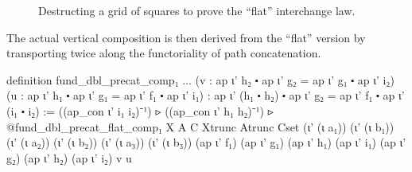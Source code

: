 \begin{figure}
\caption{Destructing a grid of squares to prove the ``flat'' interchange law.}
\label{fig:interchange-destruct}
\end{figure}

The actual vertical composition is then derived from the ``flat'' version by transporting
twice along the functoriality  of path concatenation.
\begin{leancodebr}
  definition fund_dbl_precat_comp₁ ...
    (v : ap ι' h₂ ⬝ ap ι' g₂ = ap ι' g₁ ⬝ ap ι' i₂)
    (u : ap ι' h₁ ⬝ ap ι' g₁ = ap ι' f₁ ⬝ ap ι' i₁) :
      ap ι' (h₁ ⬝ h₂) ⬝ ap ι' g₂ = ap ι' f₁ ⬝ ap ι' (i₁ ⬝ i₂) :=
  ((ap_con ι' i₁ i₂)⁻¹) ▹ ((ap_con ι' h₁ h₂)⁻¹) ▹
  @fund_dbl_precat_flat_comp₁ X A C Xtrunc Atrunc Cset
    (ι' (ι a₁)) (ι' (ι b₁)) (ι' (ι a₂)) (ι' (ι b₂)) (ι' (ι a₃)) (ι' (ι b₃))
    (ap ι' f₁) (ap ι' g₁) (ap ι' h₁) (ap ι' i₁)
    (ap ι' g₂) (ap ι' h₂) (ap ι' i₂) v u
\end{leancodebr}


